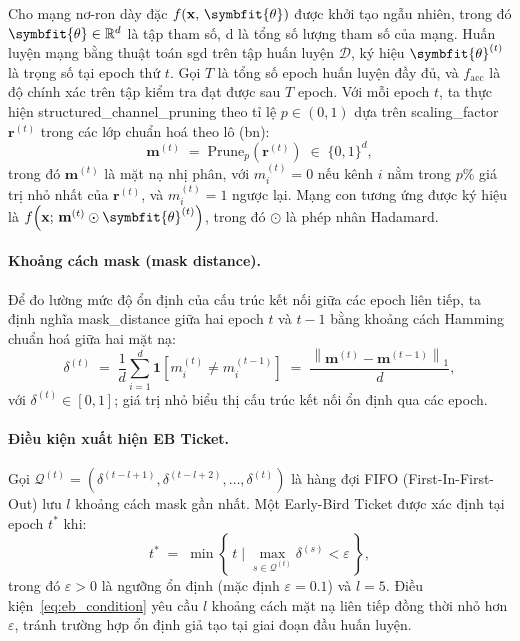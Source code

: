 Cho mạng nơ-ron dày đặc $f(\mathbf{x},\,\symbfit{\theta})$ được khởi tạo ngẫu nhiên, trong đó
$\symbfit{\theta} \in \mathbb{R}^{d}$ là tập tham số, d là tổng số lượng tham số của mạng.
Huấn luyện mạng bằng thuật toán \gls{sgd} trên tập huấn luyện $\mathcal{D}$,
ký hiệu $\symbfit{\theta}^{(t)}$ là trọng số tại epoch thứ $t$.
Gọi $T$ là tổng số epoch huấn luyện đầy đủ, và $f_{\mathrm{acc}}$ là độ chính xác trên tập kiểm tra
đạt được sau $T$ epoch.
Với mỗi epoch $t$, ta thực hiện \gls{structured_channel_pruning} theo tỉ lệ
$p \in (0,1)$ dựa trên \gls{scaling_factor} $\mathbf{r}^{(t)}$ trong các lớp chuẩn hoá theo lô
(\gls{bn}):
\[
    \mathbf{m}^{(t)} \;=\; \mathrm{Prune}_{p}\!\left(\mathbf{r}^{(t)}\right)
    \;\in\; \{0,1\}^{d},
\]
trong đó $\mathbf{m}^{(t)}$ là mặt nạ nhị phân, với $m_i^{(t)} = 0$ nếu kênh $i$
nằm trong $p\%$ giá trị nhỏ nhất của $\mathbf{r}^{(t)}$, và $m_i^{(t)} = 1$ ngược lại.
Mạng con tương ứng được ký hiệu là $f\!\left(\mathbf{x};\,\mathbf{m}^{(t)} \odot \symbfit{\theta}^{(t)}\right)$,
trong đó $\odot$ là phép nhân Hadamard.

\paragraph{\textbf{Khoảng cách mask} (mask distance). \cite{earlybird}}
Để đo lường mức độ ổn định của cấu trúc kết nối giữa các epoch liên tiếp, ta định nghĩa
\gls{mask_distance} giữa hai epoch $t$ và $t-1$ bằng khoảng cách Hamming
chuẩn hoá giữa hai mặt nạ:
\begin{equation}
    \delta^{(t)} \;=\; \frac{1}{d}\sum_{i=1}^{d}
    \mathbf{1}\!\left[m_i^{(t)} \neq m_i^{(t-1)}\right]
    \;=\; \frac{\left\|\mathbf{m}^{(t)} - \mathbf{m}^{(t-1)}\right\|_1}{d},
    \label{eq:mask_distance}
\end{equation}
với $\delta^{(t)} \in [0,1]$; giá trị nhỏ biểu thị cấu trúc kết nối ổn định qua các epoch.

\paragraph{\textbf{Điều kiện xuất hiện EB Ticket.}\cite{earlybird}}
Gọi $\mathcal{Q}^{(t)} = \left(\delta^{(t-l+1)}, \delta^{(t-l+2)}, \ldots, \delta^{(t)}\right)$
là hàng đợi FIFO (First-In-First-Out) lưu $l$ khoảng cách mask gần nhất.
Một Early-Bird Ticket được xác định tại epoch $t^*$ khi:
\begin{equation}
    t^* \;=\; \min\left\{\, t \;\Big|\;
    \max_{s \in \mathcal{Q}^{(t)}} \delta^{(s)} < \varepsilon \,\right\},
    \label{eq:eb_condition}
\end{equation}
trong đó $\varepsilon > 0$ là ngưỡng ổn định (mặc định $\varepsilon = 0.1$) và $l = 5$.
Điều kiện~\eqref{eq:eb_condition} yêu cầu $l$ khoảng cách mặt nạ liên tiếp đồng thời
nhỏ hơn $\varepsilon$, tránh trường hợp ổn định giả tạo tại giai đoạn đầu huấn luyện.

